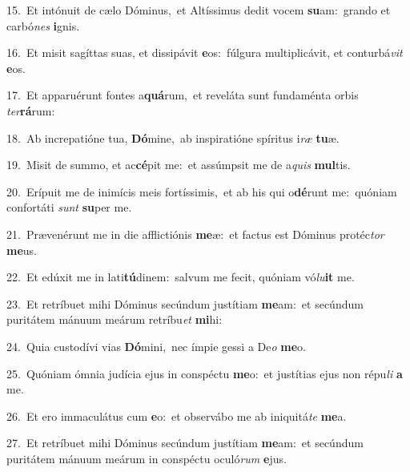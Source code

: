 {\numbfont\textcolor{\numbcolor}{15.}}~Et intónuit de cælo Dóminus,~\dagger et Altíssimus dedit vocem \textbf{su}\-am:~\star grando et carbó\textit{nes} \textbf{i}\-gnis.\par
{\numbfont\textcolor{\numbcolor}{16.}}~Et misit sagíttas suas, et dissipávit \textbf{e}\-os:~\star fúlgura multiplicávit, et conturbá\textit{vit} \textbf{e}\-os.\par
{\numbfont\textcolor{\numbcolor}{17.}}~Et apparuérunt fontes a\-\textbf{quá}\-rum,~\star et reveláta sunt fundaménta orbis \textit{ter}\-\textbf{rá}rum:\par
{\numbfont\textcolor{\numbcolor}{18.}}~Ab increpatióne tua, \textbf{Dó}\-mine,~\star ab inspiratióne spíritus i\textit{ræ} \textbf{tu}\-æ.\par
{\numbfont\textcolor{\numbcolor}{19.}}~Misit de summo, et ac\-\textbf{cé}\-pit me:~\star et assúmpsit me de a\textit{quis} \textbf{mul}\-tis.\par
{\numbfont\textcolor{\numbcolor}{20.}}~Erípuit me de inimícis meis fortíssimis,~\dagger et ab his qui o\-\textbf{dé}\-runt me:~\star quóniam confortáti \textit{sunt} \textbf{su}\-per me.\par
{\numbfont\textcolor{\numbcolor}{21.}}~Prævenérunt me in die afflictiónis \textbf{me}\-æ:~\star et factus est Dóminus protéc\textit{tor} \textbf{me}\-us.\par
{\numbfont\textcolor{\numbcolor}{22.}}~Et edúxit me in lati\-\textbf{tú}\-dinem:~\star salvum me fecit, quóniam vó\-\textit{lu}\-\textbf{it} me.\par
{\numbfont\textcolor{\numbcolor}{23.}}~Et retríbuet mihi Dóminus secúndum justítiam \textbf{me}\-am:~\star et secúndum puritátem mánuum meárum retríbu\textit{et} \textbf{mi}\-hi:\par
{\numbfont\textcolor{\numbcolor}{24.}}~Quia custodívi vias \textbf{Dó}\-mini,~\star nec ímpie gessi a De\textit{o} \textbf{me}\-o.\par
{\numbfont\textcolor{\numbcolor}{25.}}~Quóniam ómnia judícia ejus in conspéctu \textbf{me}\-o:~\star et justítias ejus non répu\textit{li} \textbf{a} me.\par
{\numbfont\textcolor{\numbcolor}{26.}}~Et ero immaculátus cum \textbf{e}\-o:~\star et observábo me ab iniquitá\textit{te} \textbf{me}\-a.\par
{\numbfont\textcolor{\numbcolor}{27.}}~Et retríbuet mihi Dóminus secúndum justítiam \textbf{me}\-am:~\star et secúndum puritátem mánuum meárum in conspéctu oculó\textit{rum} \textbf{e}\-jus.\par

